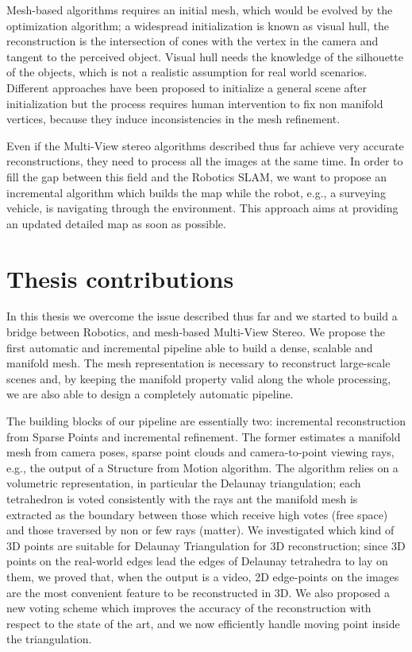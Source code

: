 Mesh-based algorithms requires an initial mesh, which would be evolved by the optimization algorithm; a widespread initialization is known as visual hull, the reconstruction is the intersection of cones with the vertex in the camera and tangent to the perceived object.
Visual hull needs the knowledge of the silhouette of the objects, which is not a realistic assumption for real world scenarios.
Different approaches have been proposed to initialize a general scene after initialization but the process requires human intervention to fix non manifold vertices, because they induce inconsistencies in the mesh refinement.

Even if the Multi-View stereo algorithms described thus far achieve very accurate reconstructions, they need to process all the images at the same time. 
In order to fill the gap between this field and the Robotics SLAM, we want to propose an incremental algorithm which builds the map while the robot, e.g., a surveying vehicle, is navigating through the environment. 
This approach aims at providing an updated detailed map as soon as possible.



\section{Thesis contributions}
In this thesis we overcome the issue described thus far and we started to build a bridge between Robotics, and mesh-based Multi-View Stereo.
We propose the first automatic and incremental pipeline able to build a dense, scalable and manifold mesh.
The mesh representation is necessary to reconstruct  large-scale scenes and, by keeping the manifold property valid along the whole processing, we are also able to design a completely automatic pipeline.

The building blocks of our pipeline are essentially two: incremental reconstruction from Sparse Points and incremental refinement.
The former estimates a  manifold mesh from camera poses, sparse point clouds and camera-to-point viewing rays, e.g., the output of a Structure from Motion algorithm.
The algorithm relies on a volumetric representation, in particular the Delaunay triangulation; each tetrahedron is voted consistently with the rays ant the manifold mesh is extracted as the boundary between those which receive high votes (free space) and those traversed by non or few rays (matter).
We investigated which kind of 3D points are suitable for Delaunay Triangulation for 3D reconstruction; since 3D points on the real-world edges lead the edges of Delaunay tetrahedra to lay on them, we proved that, when the output is a video, 2D edge-points on the images are the most convenient feature to be reconstructed in 3D.
We also proposed a new voting scheme which improves the accuracy of the reconstruction with respect to the state of the art, and we now efficiently handle moving point inside the triangulation.

